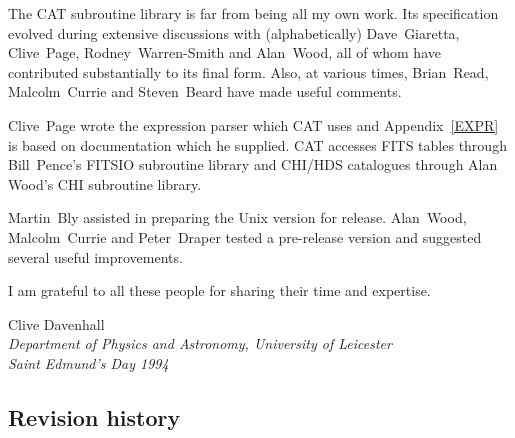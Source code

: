The CAT subroutine library is far from being all my own work. Its
specification evolved during extensive discussions with (alphabetically)
Dave~Giaretta, Clive~Page, Rodney~Warren-Smith and Alan~Wood, all of 
whom have contributed substantially to its final form. Also, at various 
times, Brian~Read, Malcolm~Currie and Steven~Beard have made useful 
comments.

Clive~Page wrote the expression parser which CAT uses and 
Appendix~\ref{EXPR} is based on documentation which he supplied. CAT 
accesses FITS tables through Bill~Pence's FITSIO subroutine library
and CHI/HDS catalogues through Alan Wood's CHI subroutine library.

Martin~Bly assisted in preparing the Unix version for release.
Alan~Wood, Malcolm~Currie and Peter~Draper tested a pre-release version 
and suggested several useful improvements.

I am grateful to all these people for sharing their time and expertise.
\begin{flushright}
Clive Davenhall \\
\latex{\raggedright} {\it Department of Physics and Astronomy, University of 
Leicester \\
Saint Edmund's Day 1994}
\end{flushright} 

\newpage
\subsection*{Revision history}

